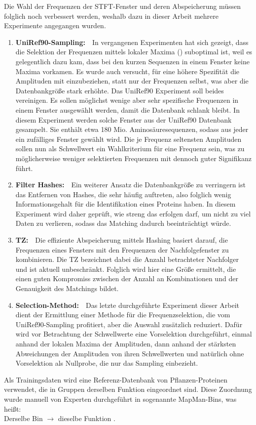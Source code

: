     Die Wahl der Frequenzen der \ac{STFT}-Fenster und deren Abspeicherung müssen folglich noch verbessert werden, weshalb dazu in dieser Arbeit mehrere Experimente angegangen wurden.
    \begin{enumerate}
        \item \textbf{UniRef90-Sampling:}\ \ In vergangenen Experimenten hat sich gezeigt, dass die Selektion der Frequenzen mittels lokaler Maxima () suboptimal ist, weil es gelegentlich dazu kam, dass bei den kurzen Sequenzen in einem Fenster keine Maxima vorkamen. Es wurde auch versucht, für eine höhere Spezifität die Amplituden mit einzubeziehen, statt nur der Frequenzen selbst, was aber die Datenbankgröße stark erhöhte. Das UniRef90 Experiment soll beides vereinigen. Es sollen möglichst wenige aber sehr spezifische Frequenzen in einem Fenster ausgewählt werden, damit die Datenbank schlank bleibt. In diesem Experiment werden solche Fenster aus der UniRef90 Datenbank gesampelt. Sie enthält etwa 180 Mio. Aminosäuresequenzen, sodass aus jeder ein zufälliges Fenster gewählt wird. Die je Frequenz seltensten Amplituden sollen nun als Schwellwert ein Wahlkriterium für eine Frequenz sein, was zu möglicherweise weniger selektierten Frequenzen mit dennoch guter Signifikanz führt.
        \item \textbf{Filter Hashes:}\ \ Ein weiterer Ansatz die Datenbankgröße zu verringern ist das Entfernen von Hashes, die sehr häufig auftreten, also folglich wenig Informationsgehalt \autocite{shannon} für die Identifikation eines Proteins haben. In diesem Experiment wird daher geprüft, wie streng das erfolgen darf, um nicht zu viel Daten zu verlieren, sodass das Matching dadurch beeinträchtigt würde. 
        \item \textbf{\acl{TZ}:}\ \ Die effiziente Abspeicherung mittels Hashing basiert darauf, die Frequenzen eines Fensters mit den Frequenzen der Nachfolgefenster zu kombinieren. Die \acl{TZ} bezeichnet dabei die Anzahl betrachteter Nachfolger und ist aktuell unbeschränkt. Folglich wird hier eine Größe ermittelt, die einen guten Kompromiss zwischen der Anzahl an Kombinationen und der Genauigkeit des Matchings bildet.
        \item \textbf{Selection-Method:}\ \ Das letzte durchgeführte Experiment dieser Arbeit dient der Ermittlung einer Methode für die Frequenzselektion, die vom UniRef90-Sampling profitiert, aber die Auswahl zusätzlich reduziert. Dafür wird vor Betrachtung der Schwellwerte eine Vorselektion durchgeführt, einmal anhand der lokalen Maxima der Amplituden, dann anhand der stärksten Abweichungen der Amplituden von ihren Schwellwerten und natürlich ohne Vorselektion als Nullprobe, die nur das Sampling einbezieht.
    \end{enumerate}
    Als Trainingsdaten wird eine Referenz-Datenbank von Pflanzen-Proteinen verwendet, die in Gruppen derselben Funktion eingeordnet sind. Diese Zuordnung wurde manuell von Experten durchgeführt in sogenannte MapMan-Bins, was heißt:\\Derselbe Bin $\rightarrow$ dieselbe Funktion \autocite{mapman}\autocite{mercator}.
